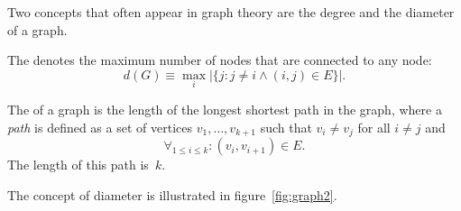 Two concepts that often appear in graph theory are the
degree and the diameter of a graph. 

\begin{definition}
The
 denotes the maximum number of nodes that are
connected to any node:
\[ 
  d(G)\equiv \max_i 
  \left|\{j\colon j\not=i\wedge (i,j)\in E\}\right|.
\]
\end{definition}

\begin{definition}
The  of a graph is the length of the longest
shortest path
in the graph, where a \emph{path}
is defined as a set of vertices
$v_1,\ldots, v_{k+1}$ such that $v_i\not=v_j$ for all $i\not=j$ and
\[ \forall_{1\leq i\leq k}\colon (v_i,v_{i+1})\in E. \]
The length of this path is~$k$.
\end{definition}
The concept of diameter is illustrated
in figure~\ref{fig:graph2}.

